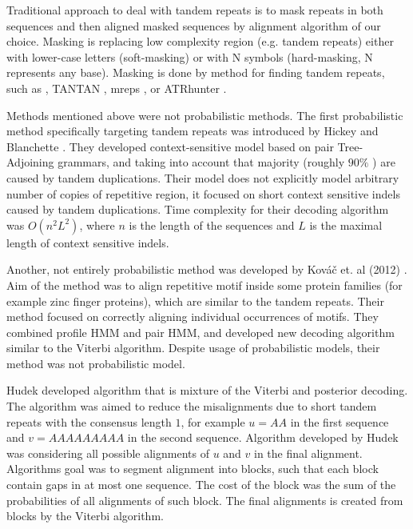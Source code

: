 Traditional approach to deal with tandem repeats is to mask repeats in both
sequences and then aligned masked sequences by alignment algorithm of our
choice. Masking is replacing low complexity region (e.g. tandem repeats) either
with lower-case letters (soft-masking) or with N symbols (hard-masking, N
represents any base). Masking is done by method for finding tandem repeats,
such as  \cite{Benson1999}, TANTAN
\cite{Frith2011}, mreps \cite{Kolpakov2003}, or ATRhunter \cite{Wexler2005}. 

Methods mentioned above were not probabilistic methods. The first probabilistic
method specifically targeting tandem repeats was introduced by Hickey and
Blanchette \cite{Hickey2011}. They developed context-sensitive model based on
pair Tree-Adjoining grammars, and taking into account that majority (roughly
$90\%$  \cite{Hickey2011}) are caused by tandem duplications.  Their model does
not explicitly model arbitrary number of copies of repetitive region, it
focused on short context sensitive indels caused by tandem duplications.  Time
complexity for their decoding algorithm was $O(n^2L^2)$, where $n$ is the
length of the sequences and $L$ is the maximal length of context sensitive
indels.

Another, not entirely probabilistic method was developed by Kováč {et. al
(2012)} \nocite{Kovac2012}. Aim of the method was to align repetitive motif
inside some protein families (for example zinc finger proteins), which are
similar to the tandem repeats. Their method focused on correctly aligning
individual occurrences of motifs. They combined profile HMM and pair HMM, and
developed new decoding algorithm similar to the Viterbi algorithm. Despite
usage of probabilistic models, their method was not probabilistic model. 

\begin{reformulate*}
Hudek \cite{Hudek2010} developed algorithm that is mixture of the Viterbi and
posterior decoding. The algorithm was aimed to reduce the misalignments due to
short tandem repeats with the consensus length $1$, for example $u=AA$ in the
first sequence and $v=AAAAAAAAA$ in the second sequence. Algorithm developed by
Hudek was considering all possible alignments of $u$ and $v$ in the final
alignment. Algorithms goal was to segment alignment into blocks, such that each
block contain gaps in at most one sequence. The cost of the block was the sum of
the probabilities of all alignments of such block. The final alignments is
created from blocks by the Viterbi algorithm.
\end{reformulate*}

